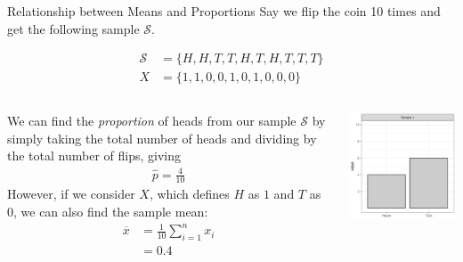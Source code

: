 \documentclass{beamer}
\begin{document}
\begin{frame}{Relationship between Means and Proportions}
\footnotesize
Say we flip the coin 10 times and get the following sample $\mathcal{S}$.

\begin{align*}
\mathcal{S} &= \{H, H, T, T, H, T, H, T, T, T\} \\
X &= \{1, 1, 0, 0, 1, 0, 1, 0, 0, 0 \}
\end{align*}
\begin{columns}

  \begin{column}{0.45\textwidth}
 We can find the \textit{proportion} of heads from our sample $\mathcal{S}$ by simply taking the total number of heads and dividing by the total number of flips, giving
 \begin{align*}
 \hat{p} = \frac{4}{10}
 \end{align*}
However, if we consider $X$, which defines $H$ as $1$ and $T$ as $0$, we can also find the sample mean:
\begin{align*}
\overline{x} &= \frac{1}{10} \sum_{i=1}^n x_i \\
&= 0.4
\end{align*}
  \end{column}
  \begin{column}{0.45\textwidth}
\begin{center}
\includegraphics[scale=0.5]{10_flip.png}
\end{center}
  \end{column}

\end{columns}
\end{frame}
\end{document}
